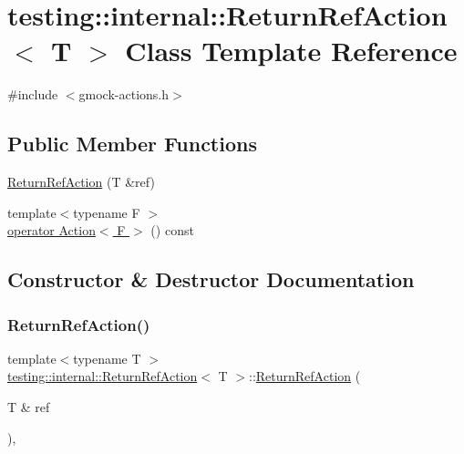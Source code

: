 \hypertarget{classtesting_1_1internal_1_1_return_ref_action}{}\section{testing\+:\+:internal\+:\+:Return\+Ref\+Action$<$ T $>$ Class Template Reference}
\label{classtesting_1_1internal_1_1_return_ref_action}


{\ttfamily \#include $<$gmock-\/actions.\+h$>$}

\subsection*{Public Member Functions}
\begin{DoxyCompactItemize}
\item 
\hyperlink{classtesting_1_1internal_1_1_return_ref_action_a1384b1cd78f3069f0493e2302f143701}{Return\+Ref\+Action} (T \&ref)
\item 
{\footnotesize template$<$typename F $>$ }\\\hyperlink{classtesting_1_1internal_1_1_return_ref_action_a48e5d411097707e558af62eb68edc162}{operator Action$<$ F $>$} () const
\end{DoxyCompactItemize}


\subsection{Constructor \& Destructor Documentation}
\mbox{\label{classtesting_1_1internal_1_1_return_ref_action_a1384b1cd78f3069f0493e2302f143701}} 
\subsubsection{\texorpdfstring{Return\+Ref\+Action()}{ReturnRefAction()}}
{\footnotesize\ttfamily template$<$typename T $>$ \\
\hyperlink{classtesting_1_1internal_1_1_return_ref_action}{testing\+::internal\+::\+Return\+Ref\+Action}$<$ T $>$\+::\hyperlink{classtesting_1_1internal_1_1_return_ref_action}{Return\+Ref\+Action} (\begin{DoxyParamCaption}\item[{T \&}]{ref }\end{DoxyParamCaption})\hspace{0.3cm}{\ttfamily [inline]}, {\ttfamily [explicit]}}




